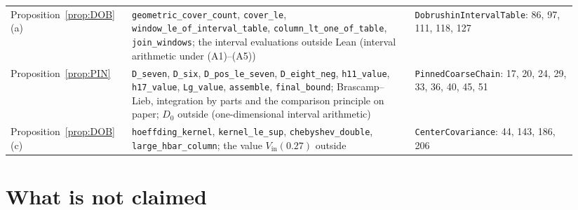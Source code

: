 \documentclass[11pt,a4paper]{article}
\theoremstyle{definition}
\theoremstyle{remark}
\newcommand{\code}[1]{\texttt{#1}}
\begin{document}
\begin{center}
\begin{tabular}{@{}p{0.20\linewidth}p{0.47\linewidth}p{0.27\linewidth}@{}}
Proposition~\ref{prop:DOB}(a) & \code{geometric\_cover\_count}, \code{cover\_le}, \code{window\_le\_of\_interval\_table}, \code{column\_lt\_one\_of\_table}, \code{join\_windows}; the interval evaluations outside Lean (interval arithmetic under (A1)--(A5)) & \code{DobrushinIntervalTable}: 86, 97, 111, 118, 127\\
Proposition~\ref{prop:PIN} & \code{D\_seven}, \code{D\_six}, \code{D\_pos\_le\_seven}, \code{D\_eight\_neg}, \code{h11\_value}, \code{h17\_value}, \code{Lg\_value}, \code{assemble}, \code{final\_bound}; Brascamp--Lieb, integration by parts and the comparison principle on paper; $D_0$ outside (one-dimensional interval arithmetic) & \code{PinnedCoarseChain}: 17, 20, 24, 29, 33, 36, 40, 45, 51\\
Proposition~\ref{prop:DOB}(c) & \code{hoeffding\_kernel}, \code{kernel\_le\_sup}, \code{chebyshev\_double}, \code{large\_hbar\_column}; the value $V_{\mathrm{in}}(0.27)$ outside & \code{CenterCovariance}: 44, 143, 186, 206\\
\bottomrule
\end{tabular}
\end{center}

\section{What is not claimed}\label{sec:notclaimed}
\end{document}
